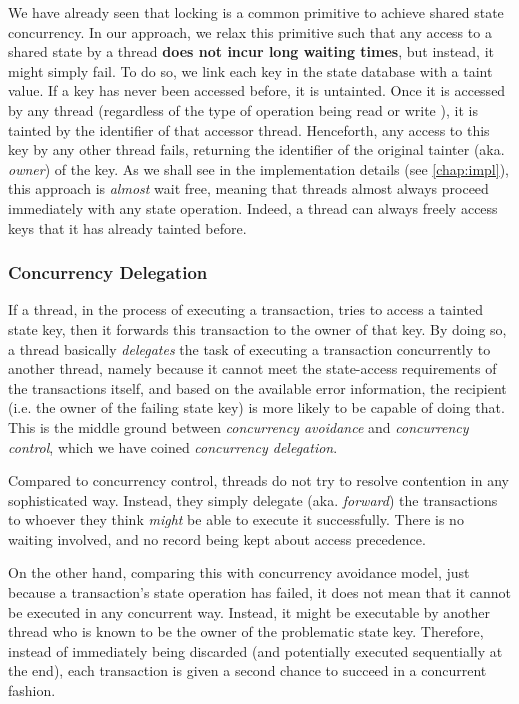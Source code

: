 We have already seen that locking is a common primitive to achieve shared state concurrency. In our
approach, we relax this primitive such that any access to a shared state by a thread \textbf{does
not incur long waiting times}, but instead, it might simply fail. To do so, we link each key in the
state database with a taint value. If a key has never been accessed before, it is untainted. Once it
is accessed by any thread (regardless of the type of operation being read or write ), it is tainted by the identifier of that
accessor thread. Henceforth, any access to this key by any other thread fails, returning the
identifier of the original tainter (aka. \textit{owner}) of the key. As we shall see in the
implementation details (see \ref{chap:impl}), this approach is \textit{almost} wait free, meaning that threads almost
always proceed immediately with any state operation. Indeed, a thread can always freely access keys
that it has already tainted before.

\subsubsection{Concurrency Delegation}

If a thread, in the process of executing a transaction, tries to access a tainted state key, then it
forwards this transaction to the owner of that key. By doing so, a thread basically
\textit{delegates} the task of executing a transaction concurrently to another thread, namely
because it cannot meet the state-access requirements of the transactions itself, and based on the
available error information, the recipient (i.e. the owner of the failing state key) is more likely
to be capable of doing that. This is the middle ground between \textit{concurrency avoidance} and
\textit{concurrency control}, which we have coined \textit{concurrency delegation}.

Compared to concurrency control, threads do not try to resolve contention in any sophisticated way.
Instead, they simply delegate (aka. \textit{forward}) the transactions to whoever they think
\textit{might} be able to execute it successfully. There is no waiting involved, and no record being
kept about access precedence.

On the other hand, comparing this with concurrency avoidance model, just because a transaction's
state operation has failed, it does not mean that it cannot be executed in any concurrent way.
Instead, it might be executable by another thread who is known to be the owner of the problematic
state key. Therefore, instead of immediately being discarded (and potentially executed sequentially
at the end), each transaction is given a second chance to succeed in a concurrent fashion.

